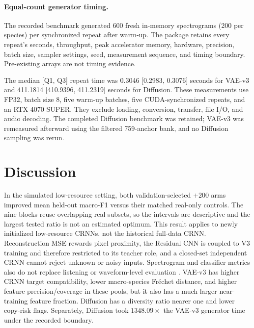 \documentclass{article}
\begin{document}
\paragraph{Equal-count generator timing.}
The recorded benchmark generated 600 fresh in-memory spectrograms (200 per
species) per synchronized repeat after warm-up. The package retains every
repeat's seconds, throughput, peak accelerator memory, hardware, precision,
batch size, sampler settings, seed, measurement sequence, and timing boundary.
Pre-existing arrays are not timing evidence.
\begin{table}[t]
  \caption{Generator-only timing comparison for matched fresh outputs.}
  \label{tab:timing}
  \centering
  \small
\end{table}
The median [Q1, Q3] repeat time was 0.3046 [0.2983, 0.3076] seconds for VAE-v3
and 411.1814 [410.9396, 411.2319] seconds for Diffusion. These measurements use
FP32, batch size 8, five warm-up batches, five CUDA-synchronized repeats, and an
RTX 4070 SUPER. They exclude loading, conversion, transfer, file I/O, and audio
decoding. The completed Diffusion benchmark was retained; VAE-v3 was
remeasured afterward using the filtered 759-anchor bank, and no Diffusion
sampling was rerun.

\section{Discussion}

In the simulated low-resource setting, both validation-selected $+200$ arms
improved mean held-out macro-F1 versus their matched real-only controls. The
nine blocks reuse overlapping real subsets, so the intervals are descriptive
and the largest tested ratio is not an estimated optimum. This result applies
to newly initialized low-resource CRNNs, not the historical full-data CRNN.
Reconstruction MSE rewards pixel proximity, the Residual CNN is coupled to
V3 training and therefore restricted to its teacher role, and a closed-set
independent CRNN cannot reject unknown or noisy inputs. Spectrogram and
classifier metrics also do not replace listening or waveform-level evaluation
\cite{bhatia2022birdsong}. VAE-v3 has higher CRNN target
compatibility, lower macro-species Fr\'echet distance, and higher feature
precision/coverage in these pools, but it also has a much larger near-training
feature fraction. Diffusion has a diversity ratio nearer one and lower
copy-risk flags. Separately, Diffusion took $1348.09\times$ the VAE-v3
generator time under the recorded boundary.
\end{document}
